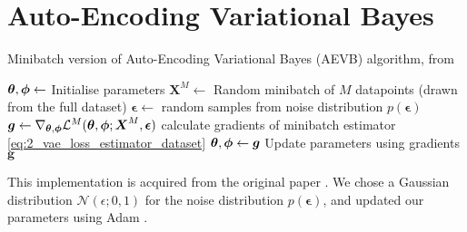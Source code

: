 \newpage
\section{Auto-Encoding Variational Bayes}
\label{app:algs_vae}

\begin{algorithm}
\caption{Minibatch version of Auto-Encoding Variational Bayes (AEVB) algorithm, from \cite{variational_bayes}} \label{alg:vae_variational_bayes}
\begin{algorithmic}[2]
\State $\boldsymbol{\theta}, \boldsymbol{\phi} \leftarrow$ Initialise parameters
\Repeat
    \State $\boldsymbol{X}^M \leftarrow$ Random minibatch of $M$ datapoints (drawn from the full dataset)
    \State $\boldsymbol{\epsilon} \leftarrow$ random samples from noise distribution $p(\boldsymbol{\epsilon})$
    \State $\boldsymbol{g} \leftarrow \nabla_{\boldsymbol{\theta}, \boldsymbol{\phi}}\mathcal{L}^M(\boldsymbol{\theta}, \boldsymbol{\phi}; \boldsymbol{X}^M, \boldsymbol{\epsilon})$ calculate gradients of minibatch estimator \eqref{eq:2_vae_loss_estimator_dataset}
    \State $\boldsymbol{\theta}, \boldsymbol{\phi} \leftarrow \boldsymbol{g}$ Update parameters using gradients $\boldsymbol{g}$
\end{algorithmic}
\end{algorithm}
\noindent
This implementation is acquired from the original paper \cite{variational_bayes}. We chose a Gaussian distribution $\mathcal{N}(\epsilon; 0, 1)$ for the noise distribution $p(\boldsymbol{\epsilon})$, and updated our parameters using Adam \cite{adam}. 
